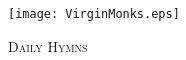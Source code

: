 \fancyhead[RE,LO]{}\fancyhead[RO,LE]{}
\fancyhead[C]{}\thispagestyle{empty}
\mainmatter
{}
{}
  \begin{center}
   \texttt{[image: VirginMonks.eps]}
   \par
   \vspace{2ex}
   	\textsc{\Huge{Daily Hymns}}
   \end{center}